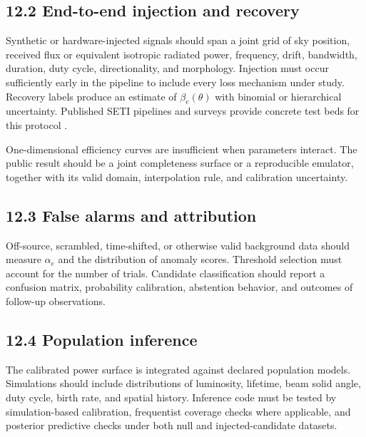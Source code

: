 \documentclass[11pt,a4paper]{article}
\begin{document}
\subsection{12.2 End-to-end injection and recovery}\label{122-end-to-end-injection-and-recovery}

Synthetic or hardware-injected signals should span a joint grid of sky position, received flux or equivalent isotropic radiated power, frequency, drift, bandwidth, duration, duty cycle, directionality, and morphology. Injection must occur sufficiently early in the pipeline to include every loss mechanism under study. Recovery labels produce an estimate of \(\beta_e(\theta)\) with binomial or hierarchical uncertainty. Published SETI pipelines and surveys provide concrete test beds for this protocol \citep{enriquez2017,price2020,margot2023,tremblaytingay2020,wlodarczyksroka2020,ma2023,pinchukmargot2022}.

One-dimensional efficiency curves are insufficient when parameters interact. The public result should be a joint completeness surface or a reproducible emulator, together with its valid domain, interpolation rule, and calibration uncertainty.

\subsection{12.3 False alarms and attribution}\label{123-false-alarms-and-attribution}

Off-source, scrambled, time-shifted, or otherwise valid background data should measure \(\alpha_e\) and the distribution of anomaly scores. Threshold selection must account for the number of trials. Candidate classification should report a confusion matrix, probability calibration, abstention behavior, and outcomes of follow-up observations.

\subsection{12.4 Population inference}\label{124-population-inference}

The calibrated power surface is integrated against declared population models. Simulations should include distributions of luminosity, lifetime, beam solid angle, duty cycle, birth rate, and spatial history. Inference code must be tested by simulation-based calibration, frequentist coverage checks where applicable, and posterior predictive checks under both null and injected-candidate datasets.
\end{document}
